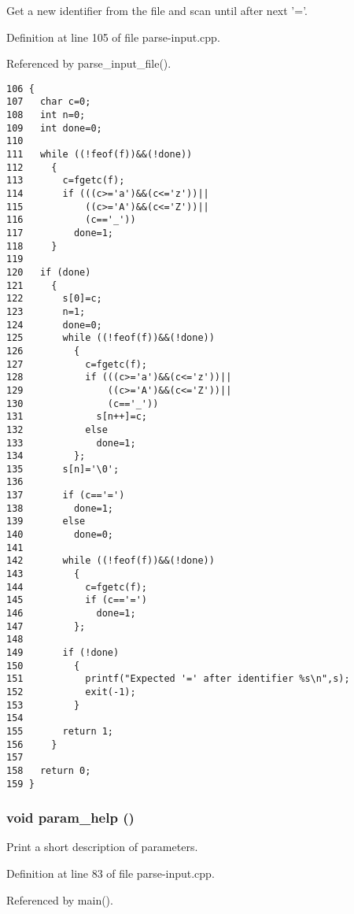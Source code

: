Get a new identifier from the file and scan until after next '='. 



Definition at line 105 of file parse-input.cpp.

Referenced by parse\_\-input\_\-file().

\begin{Code}\begin{verbatim}106 {
107   char c=0;
108   int n=0;
109   int done=0;
110 
111   while ((!feof(f))&&(!done))
112     {
113       c=fgetc(f);
114       if (((c>='a')&&(c<='z'))||
115           ((c>='A')&&(c<='Z'))||
116           (c=='_'))
117         done=1;
118     }
119 
120   if (done)
121     {
122       s[0]=c;
123       n=1;
124       done=0;
125       while ((!feof(f))&&(!done)) 
126         {
127           c=fgetc(f);
128           if (((c>='a')&&(c<='z'))||
129               ((c>='A')&&(c<='Z'))||
130               (c=='_'))
131             s[n++]=c;
132           else 
133             done=1;
134         };
135       s[n]='\0';
136 
137       if (c=='=')
138         done=1;
139       else
140         done=0;
141 
142       while ((!feof(f))&&(!done))
143         {
144           c=fgetc(f);
145           if (c=='=')
146             done=1;
147         };
148       
149       if (!done)
150         {
151           printf("Expected '=' after identifier %s\n",s);
152           exit(-1);
153         }
154 
155       return 1;
156     }
157 
158   return 0;
159 }
\end{verbatim}\end{Code}


\hypertarget{parse-input_8hpp_e30f981622da23c664e95e813953673d}{
\subsubsection[param\_\-help]{\setlength{\rightskip}{0pt plus 5cm}void param\_\-help ()}}
\label{parse-input_8hpp_e30f981622da23c664e95e813953673d}


Print a short description of parameters. 



Definition at line 83 of file parse-input.cpp.

Referenced by main().

